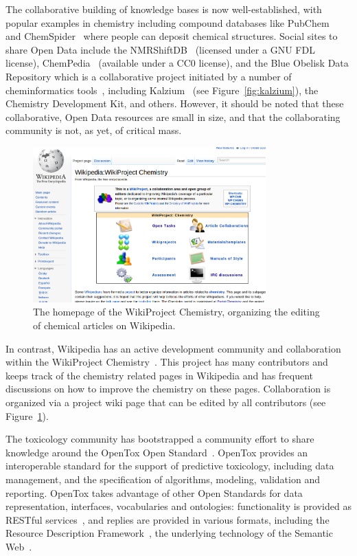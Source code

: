 \documentclass[11pt]{book}
\begin{document}
The collaborative building of knowledge bases is now well-established,
with popular examples in chemistry including compound databases
like PubChem~\cite{url:pubchem} and ChemSpider~\cite{url:chemspider}
where people can deposit chemical structures.
Social sites to share Open Data include the
NMRShiftDB~\cite{Steinbeck2004} (licensed under a GNU FDL license),
ChemPedia~\cite{chempedia} (available under a CC0 license),
and the Blue Obelisk Data Repository which is a collaborative project
initiated by a number
of cheminformatics tools~\cite{Guha2006}, including Kalzium~\cite{url:kalzium}
(see Figure~\ref{fig:kalzium}),
the Chemistry Development Kit, and others.
However, it should be noted that these collaborative, Open Data
resources are small in size, and that the collaborating community
is not, as yet, of critical mass.

\begin{figure}[bt]
\begin{center}
\includegraphics[width=0.8\textwidth]{graphics/wikichemistry}
\end{center}
\caption{The homepage of the WikiProject Chemistry, organizing the
editing of chemical articles on Wikipedia.}
\label{fig:wikichem}
\end{figure}

In contrast, Wikipedia has an active development community and
collaboration within the WikiProject Chemistry~\cite{wikichem}.
This project has many contributors and keeps track of the chemistry
related pages in Wikipedia and has frequent discussions on how
to improve the chemistry on these pages. Collaboration is organized
via a project wiki page that can be edited by all contributors
(see Figure~\ref{fig:wikichem}).

The toxicology community has bootstrapped
a community effort to share knowledge around the OpenTox Open Standard~\cite{Hardy2010}.
OpenTox provides an interoperable standard for the support of predictive toxicology,
including data management, and the specification of algorithms, modeling, validation and
reporting. OpenTox takes advantage of other Open Standards for data representation,
interfaces, vocabularies and ontologies: functionality is provided as
RESTful services~\cite{fielding:2000},
and replies are provided in various formats, including the Resource Description
Framework~\cite{Carroll:04:RDF},
the underlying technology of the Semantic Web~\cite{BernersLee2001}.
\end{document}
